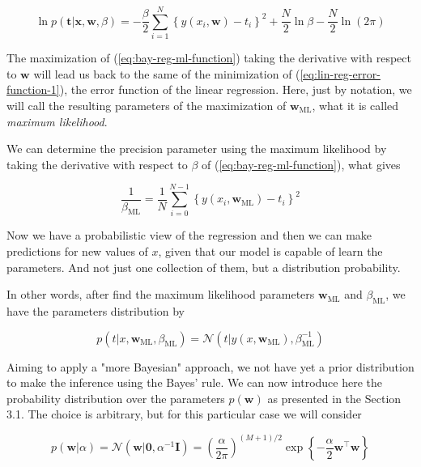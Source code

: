 \documentclass[11pt]{article} %
\begin{document}
\begin{equation}
   \label{eq:bay-reg-ml-function}
   \ln p(\mathbf{t} | \mathbf{x}, \mathbf{w}, \beta)=-\frac{\beta}{2} \sum_{i=1}^{N}\left\{y\left(x_{i}, \mathbf{w}\right)-t_{i}\right\}^{2}+\frac{N}{2} \ln \beta-\frac{N}{2} \ln (2 \pi)
\end{equation}

The maximization of (\ref{eq:bay-reg-ml-function}) taking the derivative with respect to $\mathbf{w}$ will lead us back to 
the same of the minimization of (\ref{eq:lin-reg-error-function-1}), the error function of the linear regression. Here, just by notation, we will call the resulting parameters of the maximization of $\mathbf{w}_{\text{ML}}$, what it is called \textit{maximum likelihood}.

We can determine the precision parameter using the maximum likelihood by taking the derivative with respect to $\beta$ of (\ref{eq:bay-reg-ml-function}), what gives

\begin{equation}
   \frac{1}{\beta_{\mathrm{ML}}}=\frac{1}{N} \sum_{i=0}^{N-1}\left\{y\left(x_{i}, \mathbf{w}_{\mathrm{ML}}\right)-t_{i}\right\}^{2}
\end{equation}

Now we have a probabilistic view of the regression and then we can make predictions for new values of $x$, given that our model is capable of learn the parameters. And not just one collection of them, but a distribution probability.

In other words, after find the maximum likelihood parameters $\mathbf{w}_\text{ML}$ and $\beta_\text{ML}$, we have the parameters distribution by

\begin{equation}
   p\left(t | x, \mathbf{w}_{\mathrm{ML}}, \beta_{\mathrm{ML}}\right)=\mathcal{N}\left(t | y\left(x, \mathbf{w}_{\mathrm{ML}}\right), \beta_{\mathrm{ML}}^{-1}\right)
\end{equation}

Aiming to apply a "more Bayesian" approach, we not have yet a prior distribution to make the inference using the Bayes' rule. We can now introduce here the probability distribution over the parameters $p(\mathbf{w})$ as presented in the Section 3.1. The choice is arbitrary, but for this particular case we will consider

\begin{equation}
   \label{eq:bay-lin-reg-prior-dist}
   p(\mathbf{w} | \alpha)=\mathcal{N}\left(\mathbf{w} | \mathbf{0}, \alpha^{-1} \mathbf{I}\right)=\left(\frac{\alpha}{2 \pi}\right)^{(M+1) / 2} \exp \left\{-\frac{\alpha}{2} \mathbf{w}^\top \mathbf{w}\right\}
\end{equation}
\end{document}
